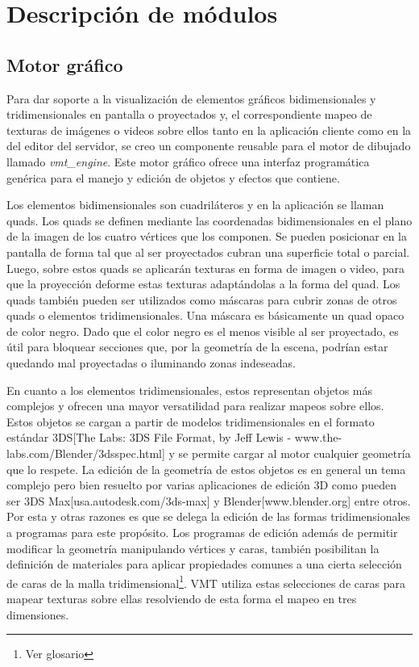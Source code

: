 \section{Descripción de módulos}

\subsection{Motor gráfico}
Para dar soporte a la visualización de elementos gráficos bidimensionales y tridimensionales en pantalla o proyectados y, el correspondiente mapeo de texturas de imágenes o videos sobre ellos tanto en la aplicación cliente como en la del editor del servidor, se creo un componente reusable para el motor de dibujado llamado \emph{vmt\_engine}. Este motor gráfico ofrece una interfaz programática genérica para el manejo y edición de objetos y efectos que contiene.

Los elementos bidimensionales son cuadriláteros y en la aplicación se llaman quads. Los quads se definen mediante las coordenadas bidimensionales en el plano de la imagen de los cuatro vértices que los componen. Se pueden posicionar en la pantalla de forma tal que al ser proyectados cubran una superficie total o parcial. Luego, sobre estos quads se aplicarán texturas en forma de imagen o video, para que la proyección deforme estas texturas adaptándolas a la forma del quad.
Los quads también pueden ser utilizados como máscaras para cubrir zonas de otros quads o elementos tridimensionales. Una máscara es básicamente un quad opaco de color negro. Dado que el color negro es el menos visible al ser proyectado, es útil para bloquear secciones que, por la geometría de la escena, podrían estar quedando mal proyectadas o iluminando zonas indeseadas.

En cuanto a los elementos tridimensionales, estos representan objetos más complejos y ofrecen una mayor versatilidad para realizar mapeos sobre ellos.
Estos objetos se cargan a partir de modelos tridimensionales en el formato estándar 3DS[The Labs: 3DS File Format, by Jeff Lewis - www.the-labs.com/Blender/3dsspec.html] y se permite cargar al motor cualquier geometría que lo respete.
La edición de la geometría de estos objetos es en general un tema complejo pero bien resuelto por varias aplicaciones de edición 3D como pueden ser 3DS Max[usa.autodesk.com/3ds-max] y Blender[www.blender.org] entre otros. Por esta y otras razones es que se delega la edición de las formas tridimensionales a programas para este propósito.
Los programas de edición además de permitir modificar la geometría manipulando vértices y caras, también posibilitan la definición de materiales para aplicar propiedades comunes a una cierta selección de caras de la malla tridimensional\footnote{Ver glosario}. VMT utiliza estas selecciones de caras para mapear texturas sobre ellas resolviendo de esta forma el mapeo en tres dimensiones.

